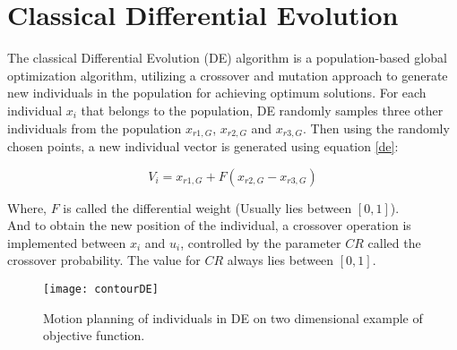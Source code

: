 
\section{Classical Differential Evolution}

The classical Differential Evolution (DE) algorithm is a population-based global optimization algorithm, utilizing a crossover and mutation approach to generate new individuals in the population for achieving optimum solutions\cite{das2011differential}. For each individual $x_i$ that belongs to the population, DE randomly samples three other individuals from the population $x_{r1,G}$, $x_{r2,G}$ and $x_{r3,G}$. Then using the randomly chosen points, a new individual vector is generated using equation \eqref{de}:

\begin{equation}
\label{de}
V_i = x_{r1,G} + F (x_{r2,G} - x_{r3,G})
\end{equation}

Where, $F$ is called the differential weight (Usually lies between $[0, 1]$).\\
And to obtain the new position of the individual, a crossover operation is implemented between $x_i$ and $u_i$, controlled by the parameter $CR$ called the crossover probability. The value for $CR$ always lies between $[0, 1]$.

\begin{figure}[h!]
  \texttt{[image: contourDE]}
 \caption{Motion planning of individuals in DE on two dimensional example of objective function.}

  \label{fig:contourDE}
\end{figure}


